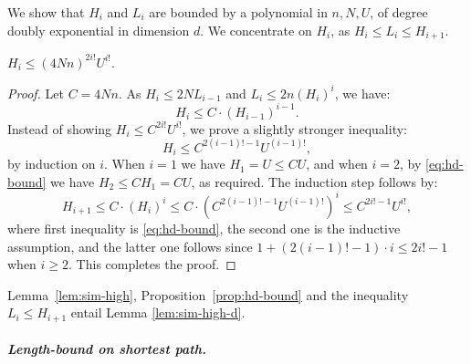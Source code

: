 \documentclass[a4paper, UKenglish, cleveref, autoref, thm-restate]{lipics-v2021}
\newcommand{\para}[1]{\vspace{-3mm}\subparagraph*{\bf #1.}}
\begin{document}
\begin{appendixproof}
We show that $H_i$ and $L_i$ are bounded by a polynomial in $n, N, U$, of
degree doubly exponential in dimension $d$.
We concentrate on $H_i$, as
$H_i \leq L_i \leq H_{i+1}$.

\begin{proposition}\label{prop:hd-bound}
$H_i \leq (4Nn)^{2i!} U^{i!}$.
\end{proposition}

\begin{proof}Let $C = 4Nn$.
As $H_i \leq 2 N L_{i-1}$ and $L_i \leq 2n (H_i)^i$, we have:
\begin{equation}\label{eq:hd-bound}
H_i \leq C \cdot (H_{i-1})^{i-1}.
\end{equation}
Instead of showing  $H_i \leq C^{2i!} U^{i!}$, we
prove a slightly stronger inequality:
\[
H_i \leq C^{2(i-1)! - 1} U^{(i-1)!},
\]
by induction on $i$.
When $i = 1$ we have $H_1 = U \leq C U$, and when
$i = 2$, by \eqref{eq:hd-bound}
we have $H_2 \leq C H_1 = C U$, as required.
The induction step follows by:
\[
H_{i+1} \leq C \cdot (H_{i})^{i} \leq C \cdot (C^{2(i-1)! -1} U^{(i-1)!})^{i} \leq C^{2 i! - 1} U^{i!},
\]
where first inequality is \eqref{eq:hd-bound}, 
the second one is the inductive assumption, and the latter one follows
since $1 + (2(i-1)! -1)\cdot i \leq 2i! -1$ when $i\geq 2$.
This completes the proof.
\end{proof}
Lemma~\ref{lem:sim-high}, Proposition~\ref{prop:hd-bound} and the inequality $L_i \leq H_{i+1}$
entail Lemma \ref{lem:sim-high-d}.
\end{appendixproof}


\para{Length-bound on shortest path}
\end{document}
